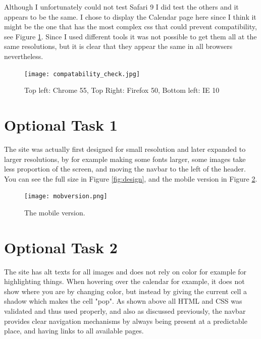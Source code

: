 \documentclass[a4paper]{scrreprt}
\begin{document}
Although I unfortunately could not test Safari 9 I did test the others and it appears to be the same. I chose to display the Calendar page here since I think it might be the one that has the most complex css that could prevent compatibility, see Figure \ref{fig:compcheck}. Since I used different tools it was not possible to get them all at the same resolutions, but it is clear that they appear the same in all browsers nevertheless.

\begin{figure}[h!]
  \begin{center}
    \texttt{[image: compatability\_check.jpg]}
    \caption{Top left: Chrome 55, Top Right: Firefox 50, Bottom left: IE 10}
    \label{fig:compcheck}
  \end{center}
\end{figure}

\section{Optional Task 1}

The site was actually first designed for small resolution and later expanded to larger resolutions, by for example making some fonts larger, some images take less proportion of the screen, and moving the navbar to the left of the header. You can see the full size in Figure \ref{fig:design}, and the mobile version in Figure \ref{fig:mobversion}.

\begin{figure}[h!]
  \begin{center}
    \texttt{[image: mobversion.png]}
    \caption{The mobile version.}
    \label{fig:mobversion}
  \end{center}
\end{figure}

\section{Optional Task 2}

The site has alt texts for all images and does not rely on color for example for highlighting things. When hovering over the calendar for example, it does not show where you are by changing color, but instead by giving the current cell a shadow which makes the cell "pop". As shown above all HTML and CSS was validated and thus used properly, and also as discussed previously, the navbar provides clear navigation mechanisms by always being present at a predictable place, and having links to all available pages.
\end{document}

